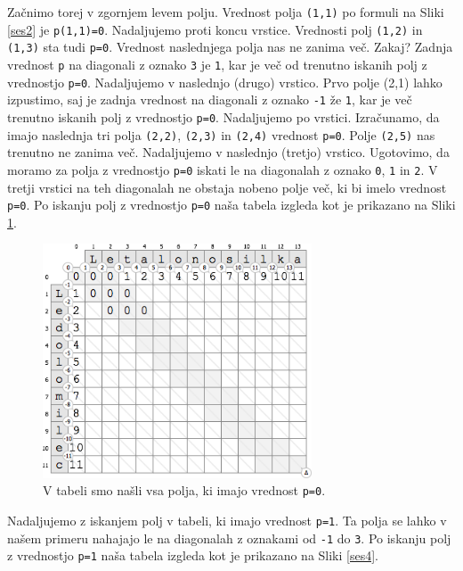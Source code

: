 \documentclass[a4paper, 12pt, twoside]{book}
\begin{document}
Začnimo torej v zgornjem levem polju. Vrednost polja {\tt (1,1)} po formuli na Sliki \ref{ses2} je {\tt p(1,1)=0}. Nadaljujemo proti koncu vrstice. Vrednosti polj {\tt (1,2)} in {\tt (1,3)} sta tudi {\tt p=0}. Vrednost naslednjega polja nas ne zanima več. Zakaj? Zadnja vrednost {\tt p} na diagonali z oznako {\tt 3} je {\tt 1}, kar je več od trenutno iskanih polj z vrednostjo {\tt p=0}. Nadaljujemo v naslednjo (drugo) vrstico. Prvo polje (2,1) lahko izpustimo, saj je zadnja vrednost na diagonali z oznako {\tt -1} že {\tt 1}, kar je več trenutno iskanih polj z vrednostjo {\tt p=0}. Nadaljujemo po vrstici. Izračunamo, da imajo naslednja tri polja {\tt (2,2)}, {\tt (2,3)} in {\tt (2,4)} vrednost {\tt p=0}. Polje {\tt (2,5)} nas trenutno ne zanima več. Nadaljujemo v naslednjo (tretjo) vrstico. Ugotovimo, da moramo za polja z vrednostjo {\tt p=0} iskati le na diagonalah z oznako {\tt 0}, {\tt 1} in {\tt 2}. V tretji vrstici na teh diagonalah ne obstaja nobeno polje več, ki bi imelo vrednost {\tt p=0}. Po iskanju polj z vrednostjo {\tt p=0} naša tabela izgleda kot je prikazano na Sliki \ref{ses3}.

\begin{figure}[placement h]
\begin{center}
\includegraphics[width=8cm]{ses3.png}
\end{center}
\caption{V tabeli smo našli vsa polja, ki imajo vrednost {\tt p=0}.}
\label{ses3}
\end{figure}

\pagebreak

Nadaljujemo z iskanjem polj v tabeli, ki imajo vrednost {\tt p=1}. Ta polja se lahko v našem primeru nahajajo le na diagonalah z oznakami od {\tt -1} do {\tt 3}. Po iskanju polj z vrednostjo {\tt p=1} naša tabela izgleda kot je prikazano na Sliki \ref{ses4}.
\end{document}
